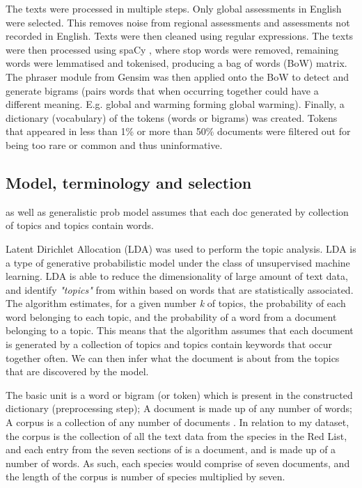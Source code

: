 The texts were processed in multiple steps. Only global assessments in English were selected. This removes noise from regional assessments and assessments not recorded in English. Texts were then cleaned using regular expressions. The texts were then processed using spaCy \parencite{spacy}, where stop words were removed, remaining words were lemmatised and tokenised, producing a bag of words (BoW) matrix. The phraser module from Gensim \parencite{rehurek_lrec} was then applied onto the BoW to detect and generate bigrams (pairs words that when occurring together could have a different meaning. E.g. global and warming forming global warming). Finally, a dictionary (vocabulary) of the tokens (words or bigrams) was created. Tokens that appeared in less than 1\% or more than 50\% documents were filtered out for being too rare or common and thus uninformative. 

\subsection{Model, terminology and selection}

as well as generalistic prob model assumes that each doc generated by collection of topics and topics contain words.

Latent Dirichlet Allocation (LDA) \parencite{blei2003latent} was used to perform the topic analysis. LDA is a type of generative probabilistic model under the class of unsupervised machine learning. LDA is able to reduce the dimensionality of large amount of text data, and identify \textit{"topics"} from within based on words that are statistically associated. The algorithm estimates, for a given number \textit{k} of topics, the probability of each word belonging to each topic, and the probability of a word from a document belonging to a topic. This means that the algorithm assumes that each document is generated by a collection of topics and topics contain keywords that occur together often. We can then infer what the document is about from the topics that are discovered by the model.

The basic unit is a word or bigram (or token) which is present in the constructed dictionary (preprocessing step); A document is made up of any number of words; A corpus is a collection of any number of documents \parencite{blei2003latent}. In relation to my dataset, the corpus is the collection of all the text data from the species in the Red List, and each entry from the seven sections of is a document, and is made up of a number of words. As such, each species would comprise of seven documents, and the length of the corpus is number of species multiplied by seven.


